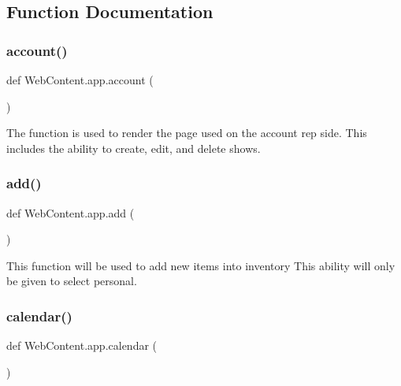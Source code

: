 \subsection{Function Documentation}
\mbox{\label{namespace_web_content_1_1app_afe68584aa29f9b47108d88d14650c05f}} 
\subsubsection{\texorpdfstring{account()}{account()}}
{\footnotesize\ttfamily def Web\+Content.\+app.\+account (\begin{DoxyParamCaption}{ }\end{DoxyParamCaption})}

\begin{DoxyVerb}The function is used to render the page used
on the account rep side.
This includes the ability to create, edit, and delete shows.
\end{DoxyVerb}
 \mbox{\label{namespace_web_content_1_1app_a01e890f5f74756a5e0db012e87a3bb32}} 
\subsubsection{\texorpdfstring{add()}{add()}}
{\footnotesize\ttfamily def Web\+Content.\+app.\+add (\begin{DoxyParamCaption}{ }\end{DoxyParamCaption})}

\begin{DoxyVerb}This function will be used to add new items into inventory
This ability will only be given to select personal.
\end{DoxyVerb}
 \mbox{\label{namespace_web_content_1_1app_a368b9d1da5b4c987484797ecce9aabc9}} 
\subsubsection{\texorpdfstring{calendar()}{calendar()}}
{\footnotesize\ttfamily def Web\+Content.\+app.\+calendar (\begin{DoxyParamCaption}{ }\end{DoxyParamCaption})}

